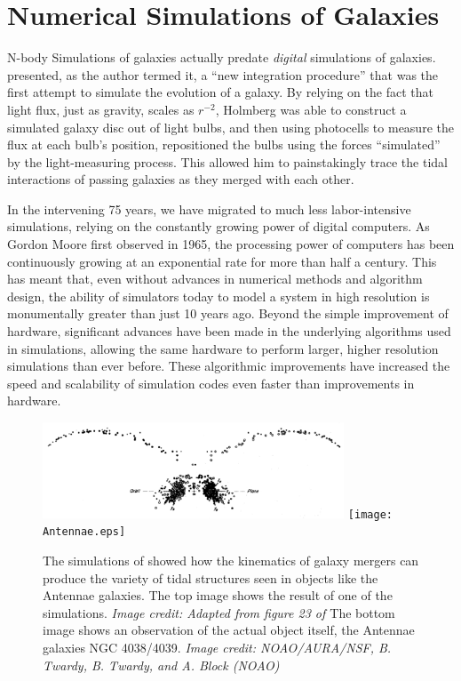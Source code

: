 \section{Numerical Simulations of Galaxies}
N-body Simulations of galaxies actually predate {\it digital} simulations of
galaxies.  \citet{Holmberg1941} presented, as the author termed it, a ``new
integration procedure'' that was the first attempt to simulate the
evolution of a galaxy.  By relying on the fact that light flux, just as gravity,
scales as $r^{-2}$, Holmberg was able to construct a simulated galaxy disc out
of light bulbs, and then using photocells to measure the flux at each bulb's
position, repositioned the bulbs using the forces ``simulated'' by the
light-measuring process.  This allowed him to painstakingly trace the tidal
interactions of passing galaxies as they merged with each other.

In the intervening 75 years, we have migrated to much less labor-intensive
simulations, relying on the constantly growing power of digital computers.  As
Gordon Moore first observed in 1965, the processing power of computers has been
continuously growing at an exponential rate for more than half a century.  This
has meant that, even without advances in numerical methods and algorithm design,
the ability of simulators today to model a system in high resolution is
monumentally greater than just 10 years ago.  Beyond the simple improvement of
hardware, significant advances have been made in the underlying algorithms used
in simulations, allowing the same hardware to perform larger, higher resolution
simulations than ever before.  These algorithmic improvements have increased the
speed and scalability of simulation codes even faster than improvements in
hardware.

\begin{figure}
    \includegraphics[width=0.8\textwidth]{Toomre.eps}
    \texttt{[image: Antennae.eps]}
    \caption[Early simulation of Antennae Galaxies]{The simulations of
    \citet{Toomre1972} showed how the kinematics of galaxy mergers can produce
    the variety of tidal structures seen in objects like the Antennae galaxies.
    The top image shows the result of one of the \citet{Toomre1972} simulations.
    \textit{Image credit: Adapted from figure 23 of \citet{Toomre1972}}
    The bottom image shows an observation of the actual object itself, the
    Antennae galaxies NGC 4038/4039. \textit{Image credit: NOAO/AURA/NSF, B.
    Twardy, B. Twardy, and A. Block (NOAO)}}
\end{figure}


